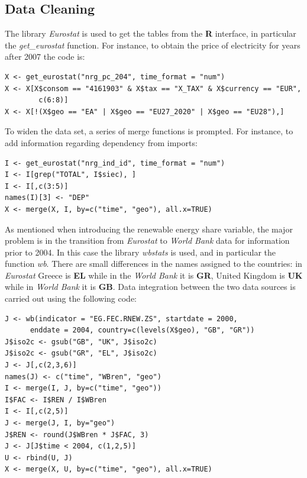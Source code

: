 \documentclass[a4paper,12pt]{book}
\begin{document}
\begin{appendices}
\chapter*{Data Cleaning}
The library \textit{Eurostat} is used to get the tables from the \textbf{R} interface, in particular the \textit{get\_eurostat} function. For instance, to obtain the price of electricity for years after 2007 the code is:

\begin{verbatim}
X <- get_eurostat("nrg_pc_204", time_format = "num")
X <- X[X$consom == "4161903" & X$tax == "X_TAX" & X$currency == "EUR",
		c(6:8)]
X <- X[!(X$geo == "EA" | X$geo == "EU27_2020" | X$geo == "EU28"),]
\end{verbatim}

To widen the data set, a series of merge functions is prompted. For instance, to add information regarding dependency from imports:

\begin{verbatim}
I <- get_eurostat("nrg_ind_id", time_format = "num")
I <- I[grep("TOTAL", I$siec), ]
I <- I[,c(3:5)]
names(I)[3] <- "DEP"
X <- merge(X, I, by=c("time", "geo"), all.x=TRUE)
\end{verbatim}

As mentioned when introducing the renewable energy share variable, the major problem is in the transition from \textit{Eurostat} to \textit{World Bank} data for information prior to 2004. In this case the library \textit{wbstats} is used, and in particular the function \textit{wb}. There are small differences in the names assigned to the countries: in \textit{Eurostat} Greece is \textbf{EL} while in the \textit{World Bank} it is \textbf{GR}, United Kingdom is \textbf{UK} while in \textit{World Bank} it is \textbf{GB}. Data integration between the two data sources is carried out using the following code:

\begin{verbatim}
J <- wb(indicator = "EG.FEC.RNEW.ZS", startdate = 2000,
	  enddate = 2004, country=c(levels(X$geo), "GB", "GR"))
J$iso2c <- gsub("GB", "UK", J$iso2c)
J$iso2c <- gsub("GR", "EL", J$iso2c)
J <- J[,c(2,3,6)]
names(J) <- c("time", "WBren", "geo")
I <- merge(I, J, by=c("time", "geo"))
I$FAC <- I$REN / I$WBren
I <- I[,c(2,5)]
J <- merge(J, I, by="geo")
J$REN <- round(J$WBren * J$FAC, 3)
J <- J[J$time < 2004, c(1,2,5)]
U <- rbind(U, J)
X <- merge(X, U, by=c("time", "geo"), all.x=TRUE)
\end{verbatim}


\end{appendices}
\end{document}
